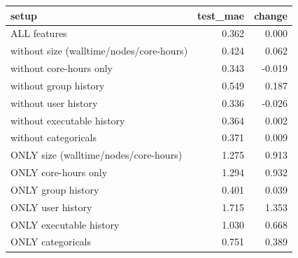 \begin{tabular}{lrr}
\toprule
setup & test_mae & change \\
\midrule
ALL features & 0.362 & 0.000 \\
without size (walltime/nodes/core-hours) & 0.424 & 0.062 \\
without core-hours only & 0.343 & -0.019 \\
without group history & 0.549 & 0.187 \\
without user history & 0.336 & -0.026 \\
without executable history & 0.364 & 0.002 \\
without categoricals & 0.371 & 0.009 \\
ONLY size (walltime/nodes/core-hours) & 1.275 & 0.913 \\
ONLY core-hours only & 1.294 & 0.932 \\
ONLY group history & 0.401 & 0.039 \\
ONLY user history & 1.715 & 1.353 \\
ONLY executable history & 1.030 & 0.668 \\
ONLY categoricals & 0.751 & 0.389 \\
\bottomrule
\end{tabular}
